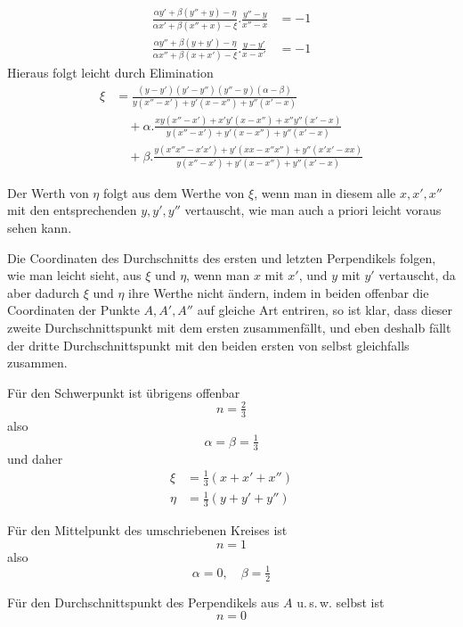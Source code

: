 %
\[
\begin{aligned}
\tfrac{\alpha y'+\beta(y''+y)-\eta}{\alpha x'+\beta(x''+x)-\xi}.\tfrac{y''-y}{x''-x}&=-1\\
\tfrac{\alpha y''+\beta(y+y')-\eta}{\alpha x''+\beta(x+x')-\xi}.\tfrac{y-y'}{x-x'}&=-1
\end{aligned}
\]
Hieraus folgt leicht durch Elimination
\[
\begin{aligned}
\xi&=\tfrac{(y-y')(y'-y'')(y''-y)(\alpha-\beta)}{y(x''-x')+y'(x-x'')+y''(x'-x)}\\
&\quad+\alpha.\tfrac{xy(x''-x')+x'y'(x-x'')+x''y''(x'-x)}{y(x''-x')+y'(x-x'')+y''(x'-x)}\\
&\quad+\beta.\tfrac{y(x''x''-x'x')+y'(xx-x''x'')+y''(x'x'-xx)}{y(x''-x')+y'(x-x'')+y''(x'-x)}
\end{aligned}
\]
\par
Der Werth von \(\eta\) folgt aus dem Werthe von \(\xi\), wenn man in diesem alle \(x,x',x''\) mit den entsprechenden \(y,y',y''\) vertauscht, wie man auch a priori leicht voraus sehen kann.

Die Coordinaten des Durchschnitts des ersten und letzten Perpendikels folgen, wie man leicht sieht, aus \(\xi\) und \(\eta\), wenn man \(x\) mit \(x'\), und \(y\) mit \(y'\) vertauscht, da aber dadurch \(\xi\) und \(\eta\) ihre Werthe nicht ändern, indem in beiden offenbar die Coordinaten der Punkte \(A,A',A''\) auf gleiche Art entriren, so ist klar, dass dieser zweite Durchschnittspunkt mit dem ersten zusammenfällt, und eben deshalb fällt der dritte Durchschnittspunkt mit den beiden ersten von selbst gleichfalls zusammen.

Für den Schwerpunkt ist übrigens offenbar
\[
n=\tfrac23
\]
also
\[
\alpha=\beta=\tfrac13
\]
und daher
\[
\begin{aligned}\xi&=\tfrac13(x+x'+x'')\\\eta&=\tfrac13(y+y'+y'')\end{aligned}
\]
\par
Für den Mittelpunkt des umschriebenen Kreises ist
\[
n=1
\]
also
\[
\alpha=0,\quad\beta=\tfrac12
\]
\par
Für den Durchschnittspunkt des Perpendikels aus \(A\) u.\,s.\,w. selbst ist
\[
n=0
\]
